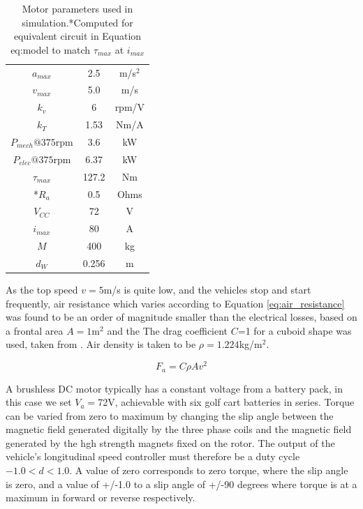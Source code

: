  \begin{table}
 	\caption{Motor parameters used in simulation.*Computed for equivalent circuit in Equation {eq:model} to match $\tau_{max}$ at $i_{max}$}
 	\label{tab:motor_params} 
 	\centering
 	\begin{tabular}{ |c|c|c| }
 		\hline
 		$a_{max}$ & 2.5 & m/s$^2$\\
 		$v_{max}$ & 5.0& m/s \\
 		$k_v$ & 6 & rpm/V\\ 
 		$k_T$ & 1.53 & Nm/A\\ 
 		$P_{mech}@375$rpm & 3.6 & kW\\ 
 		$P_{elec}@375$rpm & 6.37 & kW \\
 		$\tau_{max}$ & 127.2 & Nm\\
 		*$R_a$ & 0.5 & Ohms\\
 		$V_{CC}$ & 72 & V\\
 		$i_{max}$ & 80 & A\\
 		$M$ & 400 & kg\\
 		$d_W$ & 0.256 & m\\
 		\hline
 	\end{tabular}
 \end{table}

As the top speed $v=5$m/s is quite low, and the vehicles stop and start frequently, air resistance which varies according to Equation \ref{eq:air_resistance} was found to be an order of magnitude smaller than the electrical losses, based on a frontal area $A=1$m$^2$ and the The drag coefficient $C$=1 for a cuboid shape was used, taken from \cite{Toolbox2004}. Air density is taken to be $\rho=1.224$kg/m$^2$.

\begin{equation}
F_a = C\rho A v^2 
\label{eq:air_resistance}
\end{equation}

A brushless DC motor typically has a constant voltage from a battery pack, in this case we set $V_a=$72V, achievable with six golf cart batteries in series. Torque can be varied from zero to maximum by changing the slip angle between the magnetic field generated digitally by the three phase coils and the magnetic field generated by the hgh strength magnets fixed on  the rotor. The output of the vehicle's longitudinal speed controller must therefore be a duty cycle $-1.0<d<1.0$. A value of zero corresponds to zero torque, where the slip angle is zero, and a value of +/-1.0 to a slip angle of +/-90 degrees where torque is at a maximum in forward or reverse respectively.

